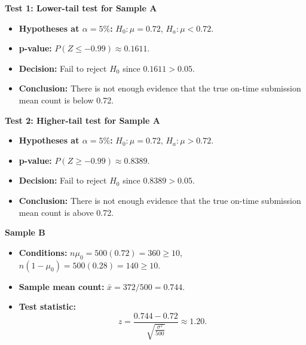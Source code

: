 \textbf{Test 1: Lower-tail test for Sample A}

\begin{itemize}
	\item \textbf{Hypotheses at \(\alpha=5\%\):} \(H_0\colon \mu=0.72\), \(H_a\colon \mu<0.72\).
	\item \textbf{p-value:} \(P(Z\le -0.99)\approx 0.1611\).
	\item \textbf{Decision:} Fail to reject \(H_0\) since \(0.1611>0.05\).
	\item \textbf{Conclusion:} There is not enough evidence that the true on-time submission mean count is below 0.72.
\end{itemize}

\begin{center}
\end{center}


\textbf{Test 2: Higher-tail test for Sample A}

\begin{itemize}
	\item \textbf{Hypotheses at \(\alpha=5\%\):} \(H_0\colon \mu=0.72\), \(H_a\colon \mu>0.72\).
	\item \textbf{p-value:} \(P(Z\ge -0.99)\approx 0.8389\).
	\item \textbf{Decision:} Fail to reject \(H_0\) since \(0.8389>0.05\).
	\item \textbf{Conclusion:} There is not enough evidence that the true on-time submission mean count is above 0.72.
\end{itemize}

\begin{center}
\end{center}


\textbf{Sample B}

\begin{itemize}
	\item \textbf{Conditions:} \(n\mu_0=500(0.72)=360\ge10\), \(n(1-\mu_0)=500(0.28)=140\ge10\).
	\item \textbf{Sample mean count:} \(\bar x=372/500=0.744\).
	\item \textbf{Test statistic:}
	\[
	z=\frac{0.744-0.72}{\sqrt{\frac{\sigma^2}{500}}}\approx 1.20.
	\]
\end{itemize}


